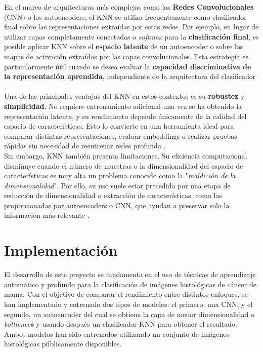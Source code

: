 \documentclass[12pt]{article} %
\begin{document}
En el marco de arquitecturas más complejas como las \textbf{Redes Convolucionales} (CNN) o los autoencoders, el KNN se utiliza frecuentemente como clasificador final sobre las representaciones extraídas por estas redes. Por ejemplo, en lugar de utilizar capas completamente conectadas o \textit{softmax} para la \textbf{clasificación final}, es posible aplicar KNN sobre el \textbf{espacio latente} de un autoencoder o sobre los mapas de activación extraídos por las capas convolucionales. Esta estrategia es particularmente útil cuando se desea evaluar la \textbf{capacidad discriminativa de la representación aprendida}, independiente de la arquitectura del clasificador \cite{van2009dimensionality}. \\

Una de las principales ventajas del KNN en estos contextos es su \textbf{robustez} y \textbf{simplicidad}. No requiere entrenamiento adicional una vez se ha obtenido la representación latente, y su rendimiento depende únicamente de la calidad del espacio de características. Esto lo convierte en una herramienta ideal para comparar distintas representaciones, evaluar embeddings o realizar pruebas rápidas sin necesidad de reentrenar redes profunda \cite{bengio2013representation}. \\

Sin embargo, KNN también presenta limitaciones. Su eficiencia computacional disminuye cuando el número de muestras o la dimensionalidad del espacio de características es muy alta un problema conocido como la "\textit{maldición de la dimensionalidad}". Por ello, su uso suele estar precedido por una etapa de reducción de dimensionalidad o extracción de características, como las proporcionadas por autoencoders o CNN, que ayudan a preservar solo la información más relevante \cite{aggarwal2014data}. \\

\newpage
\section{Implementación}
El desarrollo de este proyecto se fundamenta en el uso de técnicas de aprendizaje automático y profundo para la clasificación de imágenes histológicas de cáncer de mama. Con el objetivo de comparar el rendimiento entre distintos enfoques, se han implementado y entrenado dos tipos de modelos: el primero, una CNN, y el segundo, un autoencoder del cual se obtiene la capa de menor dimensionalidad o \textit{bottleneck} y usando después un clasificador KNN para obtener el resultado. Ambos modelos han sido entrenados utilizando un conjunto de imágenes histológicas públicamente disponibles.\\
\end{document}
